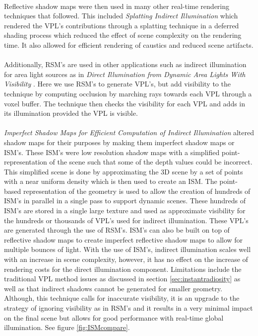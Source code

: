 \paragraph{}
Reflective shadow maps were then used in many other real-time rendering techniques that followed.  This included \textit{Splatting Indirect Illumination} \cite{Dachsbacher2006} which rendered the VPL's contributions through a splatting technique in a deferred shading process which reduced the effect of scene complexity on the rendering time.  It also allowed for efficient rendering of caustics and reduced scene artifacts.

\paragraph{}
Additionally, RSM's are used in other applications such as indirect illumination for area light sources as in \textit{Direct Illumination from Dynamic Area Lights With Visibility} \cite{Nichols2010}.  Here we use RSM's to generate VPL's, but add visibility to the technique by computing occlusion by marching rays towards each VPL through a voxel buffer.  The technique then checks the visibility for each VPL and adds in its illumination provided the VPL is visible.

\paragraph{}
\textit{Imperfect Shadow Maps for Efficient Computation of Indirect Illumination} \cite{Ritschel2008} altered shadow maps for their purposes by making them imperfect shadow maps or ISM's.  These ISM's were low resolution shadow maps with a simplified point-representation of the scene such that some of the depth values could be incorrect.  This simplified scene is done by approximating the 3D scene by a set of points with a near uniform density which is then used to create an ISM.  The point-based representation of the geometry is used to allow the creation of hundreds of ISM's in parallel in a single pass to support dynamic scenes.  These hundreds of ISM's are stored in a single large texture and used as approximate visibility for the hundreds or thousands of VPL's used for indirect illumination.  These VPL's are generated through the use of RSM's.  ISM's can also be built on top of reflective shadow maps to create imperfect reflective shadow maps to allow for multiple bounces of light.  With the use of ISM's, indirect illumination scales well with an increase in scene complexity, however, it has no effect on the increase of rendering costs for the direct illumination component.  Limitations include the traditional VPL method issues as discussed in section \ref{sec:instantradiosity} as well as that indirect shadows cannot be generated for smaller geometry.  Although, this technique calls for inaccurate visibility, it is an upgrade to the strategy of ignoring visibility as in RSM's and it results in a very minimal impact on the final scene but allows for good performance with real-time global illumination.  See figure \ref{fig:ISMcompare}.

